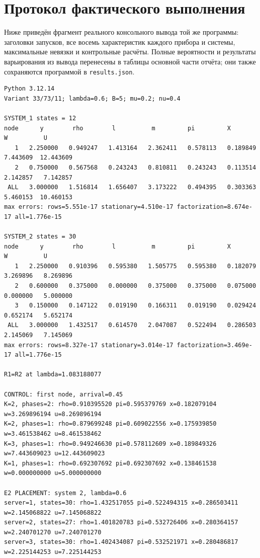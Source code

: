 \documentclass[a4paper,12pt]{article}
\begin{document}


\clearpage
\section{Протокол фактического выполнения}\label{app:log}
Ниже приведён фрагмент реального консольного вывода той же программы: заголовки запусков, все восемь характеристик каждого прибора и системы, максимальные невязки и контрольные расчёты. Полные вероятности и результаты варьирования из вывода перенесены в таблицы основной части отчёта; они также сохраняются программой в \texttt{results.json}.

\begin{lstlisting}[language={},numbers=none,basicstyle=\ttfamily\tiny]
Python 3.12.14
Variant 33/73/11; lambda=0.6; B=5; mu=0.2; nu=0.4

SYSTEM_1 states = 12
node      y        rho        l          m         pi         X          W          U
   1   2.250000   0.949247   1.413164   2.362411   0.578113   0.189849   7.443609  12.443609
   2   0.750000   0.567568   0.243243   0.810811   0.243243   0.113514   2.142857   7.142857
 ALL   3.000000   1.516814   1.656407   3.173222   0.494395   0.303363   5.460153  10.460153
max errors: rows=5.551e-17 stationary=4.510e-17 factorization=8.674e-17 all=1.776e-15

SYSTEM_2 states = 30
node      y        rho        l          m         pi         X          W          U
   1   2.250000   0.910396   0.595380   1.505775   0.595380   0.182079   3.269896   8.269896
   2   0.600000   0.375000   0.000000   0.375000   0.375000   0.075000   0.000000   5.000000
   3   0.150000   0.147122   0.019190   0.166311   0.019190   0.029424   0.652174   5.652174
 ALL   3.000000   1.432517   0.614570   2.047087   0.522494   0.286503   2.145069   7.145069
max errors: rows=8.327e-17 stationary=3.014e-17 factorization=3.469e-17 all=1.776e-15

R1=R2 at lambda=1.083188077

CONTROL: first node, arrival=0.45
K=2, phases=2: rho=0.910395520 pi=0.595379769 x=0.182079104 w=3.269896194 u=8.269896194
K=2, phases=1: rho=0.879699248 pi=0.609022556 x=0.175939850 w=3.461538462 u=8.461538462
K=3, phases=1: rho=0.949246630 pi=0.578112609 x=0.189849326 w=7.443609023 u=12.443609023
K=1, phases=1: rho=0.692307692 pi=0.692307692 x=0.138461538 w=0.000000000 u=5.000000000

E2 PLACEMENT: system 2, lambda=0.6
server=1, states=30: rho=1.432517055 pi=0.522494315 x=0.286503411 w=2.145068822 u=7.145068822
server=2, states=27: rho=1.401820783 pi=0.532726406 x=0.280364157 w=2.240701270 u=7.240701270
server=3, states=30: rho=1.402434087 pi=0.532521971 x=0.280486817 w=2.225144253 u=7.225144253
\end{lstlisting}
\end{document}
